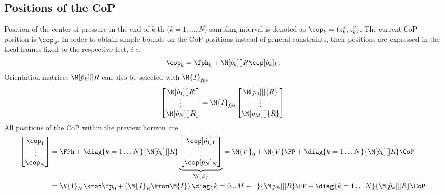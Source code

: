 \subsection{Positions of the CoP}
Position of the center of pressure in the end of $k$-th ($k = 1,\dots,N$)
sampling interval is denoted as $\cop_k = (z^x_k, z^y_k)$. The current
\acs{CoP} position is $\cop_0$. In order to obtain simple bounds on the
\acs{CoP} positions instead of general constraints, their positions are
expressed in the local frames fixed to the respective feet, \emph{i.e.}
%
\begin{equation}
    \cop_k = \fph_k + \M[\hat{p}_k][]{R} \cop[\hat{p}_k]_k.
\end{equation}
%
Orientation matrices $\M[\hat{p}_k][]{R}$ can also be selected with
$\M{I}_{\mathit{fps}}$
%
\begin{equation}
    \begin{bmatrix}
        \M[\hat{p}_1][]{R}\\
        \vdots\\
        \M[\hat{p}_N][]{R}\\
    \end{bmatrix}
    =
    \M{I}_{\mathit{fps}}
    \begin{bmatrix}
        \M[p_0][]{R}\\
        \vdots\\
        \M[p_M][]{R}\\
    \end{bmatrix}
\end{equation}
%
All positions of the \acs{CoP} within the preview horizon are
%
\begin{equation}
    \begin{split}
        \begin{bmatrix}
            \cop_1 \\
            \vdots \\
            \cop_N \\
        \end{bmatrix}
        & =
        \FPh
        +
        \diag{k = 1 \dots N}{\M[\hat{p}_k][]{R}}
        \underbrace{
        \begin{bmatrix}
            \cop[\hat{p}_1]_1 \\
            \vdots \\
            \cop[\hat{p}_N]_N \\
        \end{bmatrix}
        }_{\V{Z}}
        =
        \M{V}_0
        +
        \M{V} \FP
        +
        \diag{k = 1 \dots N}{\M[\hat{p}_k][]{R}}
        \CoP\\
        & =
        \V{1}_N
        \kron
        \fp_0
        +
        \left(
            \M{I}_R \kron \M{I}
        \right)
        \diag{k = 0...M-1}{ \M[p_{k}][]{R} }
        \FP
        +
        \diag{k = 1 \dots N}{\M[\hat{p}_k][]{R}}
        \CoP
    \end{split}
\end{equation}
%


